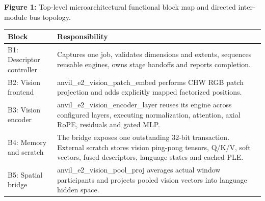 \documentclass[11pt,a4paper]{article}
\begin{document}
\begin{center}
\begin{minipage}{\textwidth}
\par\vspace{3pt}

{\small\textbf{Figure 1:} Top-level microarchitectural functional block map and directed inter-module bus topology.}\end{minipage}\end{center}

{\small\renewcommand{\arraystretch}{1.18}\begin{longtable}{@{}L{0.24\textwidth}|L{0.7\textwidth}@{}}\toprule

\textbf{Block} & \textbf{Responsibility}\\\midrule\endhead

B1: Descriptor controller & Captures one job,\allowbreak{} validates dimensions and extents,\allowbreak{} sequences reusable engines,\allowbreak{} owns stage handoffs and reports completion.\\[2pt]\hline

B2: Vision frontend & anvil\_\allowbreak{}e2\_\allowbreak{}vision\_\allowbreak{}patch\_\allowbreak{}embed performs CHW RGB patch projection and adds explicitly mapped factorized positions.\\[2pt]\hline

B3: Vision encoder & anvil\_\allowbreak{}e2\_\allowbreak{}vision\_\allowbreak{}encoder\_\allowbreak{}layer reuses its engine across configured layers,\allowbreak{} executing normalization,\allowbreak{} attention,\allowbreak{} axial RoPE,\allowbreak{} residuals and gated MLP.\\[2pt]\hline

B4: Memory and scratch & The bridge exposes one outstanding 32-bit transaction. External scratch stores vision ping-pong tensors,\allowbreak{} Q/\allowbreak{}K/\allowbreak{}V,\allowbreak{} soft vectors,\allowbreak{} fused descriptors,\allowbreak{} language states and cached PLE.\\[2pt]\hline

B5: Spatial bridge & anvil\_\allowbreak{}e2\_\allowbreak{}vision\_\allowbreak{}pool\_\allowbreak{}proj averages actual window participants and projects pooled vision vectors into language hidden space.\\[2pt]\hline


\end{longtable}}
\end{document}
